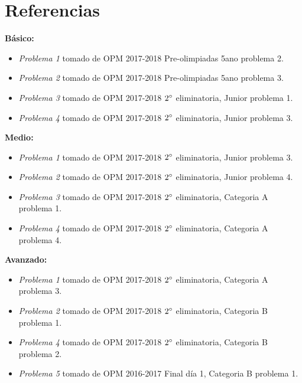 \newpage

\section*{Referencias}
\textbf{Básico: }
		\begin{itemize}
			\item \textit{Problema 1} tomado de OPM 2017-2018 Pre-olimpiadas 5ano problema 2. 
			\item \textit{Problema 2} tomado de OPM 2017-2018 Pre-olimpiadas 5ano problema 3.
			\item \textit{Problema 3} tomado de OPM 2017-2018 $2\degree$ eliminatoria, Junior problema 1.
			\item \textit{Problema 4} tomado de OPM 2017-2018 $2\degree$ eliminatoria, Junior problema 3.
		\end{itemize}
	
\textbf{Medio: }
\begin{itemize}
	\item \textit{Problema 1} tomado de OPM 2017-2018 $2\degree$ eliminatoria, Junior problema 3.
	\item \textit{Problema 2} tomado de OPM 2017-2018 $2\degree$ eliminatoria, Junior problema 4.
	\item \textit{Problema 3} tomado de OPM 2017-2018 $2\degree$ eliminatoria, Categoria A problema 1.
	\item \textit{Problema 4} tomado de OPM 2017-2018 $2\degree$ eliminatoria, Categoria A problema 4.
\end{itemize}

\textbf{Avanzado: }
\begin{itemize}
	\item \textit{Problema 1} tomado de OPM 2017-2018 $2\degree$ eliminatoria, Categoria A problema 3.
	\item	\textit{Problema 2} tomado de OPM 2017-2018 $2\degree$ eliminatoria, Categoria B problema 1.
	\item	\textit{Problema 4} tomado de OPM 2017-2018 $2\degree$ eliminatoria, Categoria B problema 2.
	\item	\textit{Problema 5} tomado de OPM 2016-2017 Final día 1, Categoria B problema 1.
\end{itemize}



\newpage
